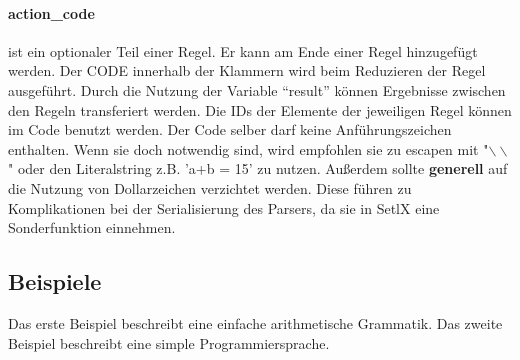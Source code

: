 \paragraph{action\_code} ist ein optionaler Teil einer Regel. Er kann am Ende einer Regel hinzugefügt werden. Der CODE innerhalb der Klammern  wird beim Reduzieren der Regel ausgeführt. Durch die Nutzung der Variable "`result"' können Ergebnisse zwischen den Regeln transferiert werden. Die IDs der Elemente der jeweiligen Regel können im Code benutzt werden. Der Code selber darf keine Anführungszeichen enthalten. Wenn sie doch notwendig sind, wird empfohlen sie zu escapen mit "$\backslash\backslash$" oder den Literalstring z.B. 'a+b = 15' zu nutzen. Außerdem sollte \textbf{generell} auf die Nutzung von Dollarzeichen verzichtet werden. Diese führen zu Komplikationen bei der Serialisierung des Parsers, da sie in SetlX eine Sonderfunktion einnehmen. 
\newpage
\subsection{Beispiele}
Das erste Beispiel beschreibt eine einfache arithmetische Grammatik.
Das zweite Beispiel beschreibt eine simple Programmiersprache.
